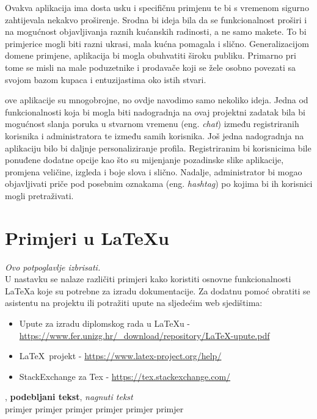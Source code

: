 		Ovakva aplikacija ima dosta usku i specifičnu primjenu te bi s vremenom sigurno zahtijevala nekakvo proširenje. Srodna bi ideja bila da se funkcionalnost proširi i na mogućnost objavljivanja raznih kućanskih radinosti, a ne samo makete. To bi primjerice mogli biti razni ukrasi, mala kućna pomagala i slično. Generalizacijom domene primjene, aplikacija bi mogla obuhvatiti široku publiku. Primarno pri tome se misli na male poduzetnike i prodavače koji se žele osobno povezati sa svojom bazom kupaca i entuzijastima oko istih stvari.
		
		 ove aplikacije su mnogobrojne, no ovdje navodimo samo nekoliko ideja. Jedna od funkcionalnosti koja bi mogla biti nadogradnja na ovaj projektni zadatak bila bi mogućnost slanja poruka u stvarnom vremenu (eng. \textit{chat}) između registriranih korisnika i administratora te između samih korisnika. Još jedna nadogradnja na aplikaciju bilo bi daljnje personaliziranje profila. Registriranim bi korisnicima bile ponuđene dodatne opcije kao što su mijenjanje pozadinske slike aplikacije, promjena veličine, izgleda i boje slova i slično. Nadalje, administrator bi mogao objavljivati priče pod posebnim oznakama (eng. \textit{hashtag}) po kojima bi ih korisnici mogli pretraživati.
		
		
		\section{Primjeri u \LaTeX u}
		
		\textit{Ovo potpoglavlje izbrisati.}\\

		U nastavku se nalaze različiti primjeri kako koristiti osnovne funkcionalnosti \LaTeX a koje su potrebne za izradu dokumentacije. Za dodatnu pomoć obratiti se asistentu na projektu ili potražiti upute na sljedećim web sjedištima:
		\begin{itemize}
			\item Upute za izradu diplomskog rada u \LaTeX u - \url{https://www.fer.unizg.hr/_download/repository/LaTeX-upute.pdf}
			\item \LaTeX\ projekt - \url{https://www.latex-project.org/help/}
			\item StackExchange za Tex - \url{https://tex.stackexchange.com/}\\
		
		\end{itemize} 	


		
		\noindent {}, \textbf{podebljani tekst}, 	\textit{nagnuti tekst}\\
		\noindent \normalsize primjer \large primjer \Large primjer \LARGE {primjer} \huge {primjer} \Huge primjer \normalsize
				
